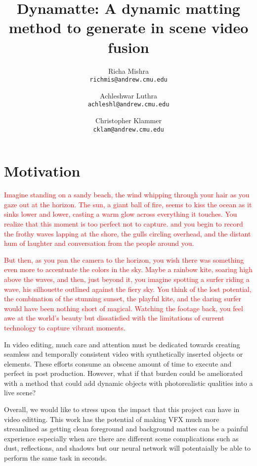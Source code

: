 \documentclass{article}
\title{Dynamatte: A dynamic matting method to generate in scene video fusion}
\author{Richa Mishra \\
\small\texttt{richmis@andrew.cmu.edu}
\and
Achleshwar Luthra \\
\small\texttt{achleshl@andrew.cmu.edu}
\and
Christopher Klammer \\
\small\texttt{cklam@andrew.cmu.edu}}
\begin{document}
\maketitle


\section{Motivation}

\textcolor{red}{Imagine standing on a sandy beach, the wind whipping through your hair as you gaze out at the horizon. The sun, a giant ball of fire, seems to kiss the ocean as it sinks lower and lower, casting a warm glow across everything it touches. You realize that this moment is too perfect not to capture. and you begin to record the frothy waves lapping at the shore, the gulls circling overhead, and the distant hum of laughter and conversation from the people around you.}

\textcolor{red}{But then, as you pan the camera to the horizon, you wish there was something even more to accentuate the colors in the sky. Maybe a rainbow kite, soaring high above the waves, and then, just beyond it, you imagine spotting a surfer riding a wave, his silhouette outlined against the fiery sky. You think of the lost potential, the combination of the stunning sunset, the playful kite, and the daring surfer would have been nothing short of magical. Watching the footage back, you feel awe at the world's beauty but dissatisfied with the limitations of current technology to capture vibrant moments.}

In video editing, much care and attention must be dedicated towards creating seamless and temporally consistent video with synthetically inserted objects or elements. These efforts consume an obscene amount of time to execute and perfect in post production. However, what if that burden could be ameliorated with a method that could add dynamic objects with photorealistic qualities into a live scene? 

Overall, we would like to stress upon the impact that this project can have in video editting. This work has the potential of making VFX much more streamlined as getting clean foreground and background mattes can be a painful experience especially when are there are different scene complications such as dust, reflections, and shadows but our neural network will potentaially be able to perform the same task in seconds.
\end{document}
